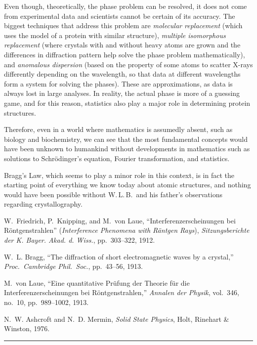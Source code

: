 Even though, theoretically, the phase problem can be resolved, it does not
come from experimental data and scientists cannot be certain of its accuracy.
The biggest techniques that address this problem are \textit{molecular
replacement} (which uses the model of a protein with similar structure),
\textit{multiple isomorphous replacement} (where crystals with and without
heavy atoms are grown and the differences in diffraction pattern help solve the
phase problem mathematically), and \textit{anomalous dispersion} (based on the
property of some atoms to scatter X-rays differently depending on the
wavelength, so that data at different wavelengths form a system for solving the
phases).  These are approximations, as data is always lost in large analyses.
In reality, the actual phase is more of a guessing game, and for this reason,
statistics also play a major role in determining protein structures.

Therefore, even in a world where mathematics is assumedly absent, such as
biology and biochemistry, we can see that the most fundamental concepts would
have been unknown to humankind without developments in mathematics such as
solutions to Schr\"{o}dinger's equation, Fourier transformation, and statistics.

Bragg's Law, which seems to play a minor role in this context, is in fact the
starting point of everything we know today about atomic structures, and nothing
would have been possible without W.\,L.\,B.\ and his father's observations
regarding crystallography.

\newpage
\articlereferences

\begin{enumerate}[label={[\arabic*]}, leftmargin=2em, itemsep=0.25em]

\item W.~Friedrich, P.~Knipping, and M.~von Laue,
      ``Interferenzerscheinungen bei R\"{o}ntgenstrahlen''
      (\textit{Interference Phenomena with R\"{a}ntgen Rays}),
      \textit{Sitzungsberichte der K. Bayer. Akad. d. Wiss.},
      pp.~303--322, 1912.

\item W.~L. Bragg,
      ``The diffraction of short electromagnetic waves by a crystal,''
      \textit{Proc.\ Cambridge Phil.\ Soc.}, pp.~43--56, 1913.

\item M.~von Laue,
      ``Eine quantitative Pr\"{u}fung der Theorie f\"{u}r die
      Interferenzerscheinungen bei R\"{o}ntgenstrahlen,''
      \textit{Annalen der Physik}, vol.~346, no.~10, pp.~989--1002, 1913.

\item N.~W. Ashcroft and N.~D. Mermin,
      \textit{Solid State Physics},
      Holt, Rinehart \& Winston, 1976.

\end{enumerate}

\vspace{0.15cm}

\noindent\textcolor{cmjgold}{\rule{\textwidth}{1.2pt}}

\vspace{0.6cm}

\newpage